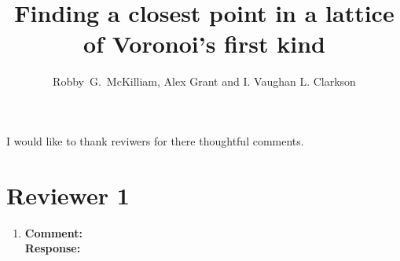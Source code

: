 \documentclass[a4paper,10pt]{article}
\title{Finding a closest point in a lattice of Voronoi's first kind}
\author{Robby~G.~McKilliam, Alex Grant and I. Vaughan L. Clarkson
}
\newcommand{\comment}[1]{\textcolor{red}{#1}}
\begin{document}
\maketitle

I would like to thank reviwers for there thoughtful comments.  %


\section*{Reviewer 1}\label{sec:reviewer-1}

\begin{enumerate}
\item\textbf{Comment:} \label{comment:shortersec2}
	\\\textbf{Response:}

\end{enumerate}


\end{document}
